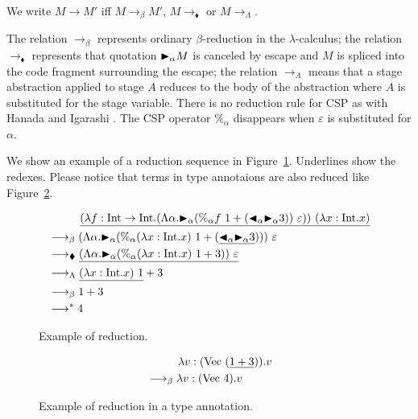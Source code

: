 We write \( M \longrightarrow M' \) iff \( M \longrightarrow_{\beta} M' \), \(
M \longrightarrow_\blacklozenge \) or \( M \longrightarrow_\Lambda \).

The relation $\longrightarrow_\beta$ represents ordinary $\beta$-reduction in
the \(\lambda\)-calculus; the relation $\longrightarrow_\blacklozenge$
represents that quotation ${\mathop{\blacktriangleright}}_\alpha M$ is canceled by escape and $M$ is
spliced into the code fragment surrounding the escape; the relation
$\longrightarrow_\Lambda$ means that a stage abstraction applied to  stage $A$
reduces to the body of the abstraction where $A$ is substituted for the stage
variable.  There is no reduction rule for CSP as with Hanada and Igarashi
\cite{Hanada2014}.  The CSP operator $\%_\alpha$ disappears when $\varepsilon$
is substituted for $\alpha$.

We show an example of a reduction sequence in
Figure~\ref{fig:example-of-reduction}. Underlines show the redexes.  Please
notice that terms in type annotaions are also reduced like
Figure~\ref{fig:reduction-in-type-annotations}.

\begin{figure}[tbp]
\begin{align*}
    & \hspace{10mm} \underline{(\lambda f:\I\to\I.(\Lambda\alpha.\TB_\alpha (\%_\alpha f\ 1 + (\TBL_\alpha \TB_\alpha 3))\ \varepsilon))\ (\lambda x:\I.x)} \\
    & \longrightarrow_\beta (\Lambda\alpha.\TB_\alpha (\%_\alpha (\lambda x:\I.x)\ 1 + (\underline{\TBL_\alpha \TB_\alpha 3})))\ \varepsilon        \\
    & \longrightarrow_\blacklozenge \underline{(\Lambda\alpha.\TB_\alpha (\%_\alpha (\lambda x:\I.x)\ 1 + 3))\ \varepsilon}                                         \\
    & \longrightarrow_\Lambda \underline{(\lambda x:\I.x)\ 1} + 3                                                                                           \\
    & \longrightarrow_\beta 1 + 3                                                                                                                           \\
    & \longrightarrow^* 4
\end{align*}
    \caption{Example of reduction.}
    \label{fig:example-of-reduction}
\end{figure}

\begin{figure}[tbp]
    \begin{align*}
        & \hspace{10mm} \lambda v:(\text{Vec }(\underline{1+3})).v \\
        & \longrightarrow_\beta \lambda v:(\text{Vec }4).v
    \end{align*}
    \caption{Example of reduction in a type annotation.}
    \label{fig:reduction-in-type-annotations}
\end{figure}


